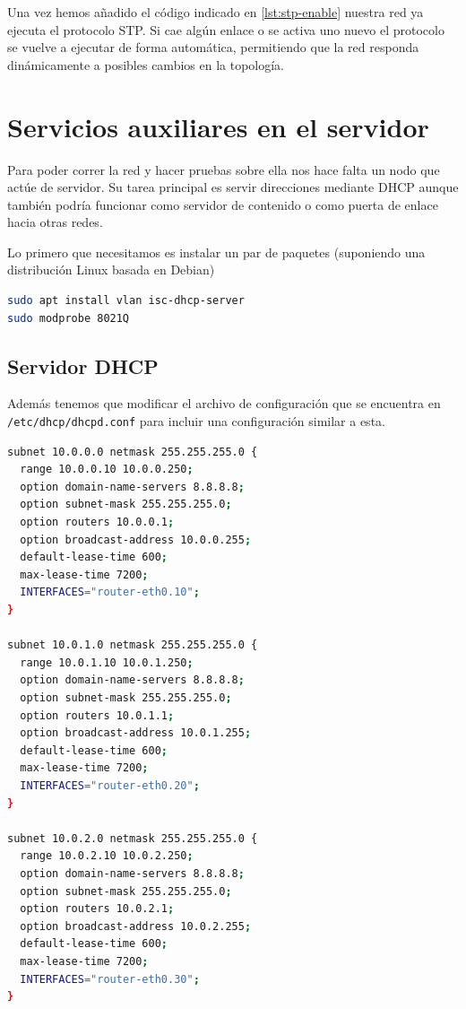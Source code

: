 Una vez hemos añadido el código indicado en \ref{lst:stp-enable} nuestra red ya ejecuta el protocolo STP. Si cae algún enlace o se activa uno nuevo el protocolo se vuelve a ejecutar de forma automática, permitiendo que la red responda dinámicamente a posibles cambios en la topología.


\section{Servicios auxiliares en el servidor}

Para poder correr la red y hacer pruebas sobre ella nos hace falta un nodo que actúe de servidor. Su tarea principal es servir direcciones mediante DHCP aunque también podría funcionar como servidor de contenido o como puerta de enlace hacia otras redes.

Lo primero que necesitamos es instalar un par de paquetes (suponiendo una distribución Linux basada en Debian)

\begin{lstlisting}[language=bash, label=lst:install-dhcp, caption={Instalación de paquetes en el servidor de la red.}]
sudo apt install vlan isc-dhcp-server
sudo modprobe 8021Q
\end{lstlisting}

\subsection{Servidor DHCP}

Además tenemos que modificar el archivo de configuración que se encuentra en \lstinline{/etc/dhcp/dhcpd.conf} para incluir una configuración similar a esta.

\begin{lstlisting}[language=bash, label=lst:dhcp-conf, caption={Configuración del servidor DHCP para servir a múltiples VLANs}]
subnet 10.0.0.0 netmask 255.255.255.0 {
  range 10.0.0.10 10.0.0.250;
  option domain-name-servers 8.8.8.8;
  option subnet-mask 255.255.255.0;
  option routers 10.0.0.1;
  option broadcast-address 10.0.0.255;
  default-lease-time 600;
  max-lease-time 7200;
  INTERFACES="router-eth0.10";
}

subnet 10.0.1.0 netmask 255.255.255.0 {
  range 10.0.1.10 10.0.1.250;
  option domain-name-servers 8.8.8.8;
  option subnet-mask 255.255.255.0;
  option routers 10.0.1.1;
  option broadcast-address 10.0.1.255;
  default-lease-time 600;
  max-lease-time 7200;
  INTERFACES="router-eth0.20";
}

subnet 10.0.2.0 netmask 255.255.255.0 {
  range 10.0.2.10 10.0.2.250;
  option domain-name-servers 8.8.8.8;
  option subnet-mask 255.255.255.0;
  option routers 10.0.2.1;
  option broadcast-address 10.0.2.255;
  default-lease-time 600;
  max-lease-time 7200;
  INTERFACES="router-eth0.30";
}
\end{lstlisting}

